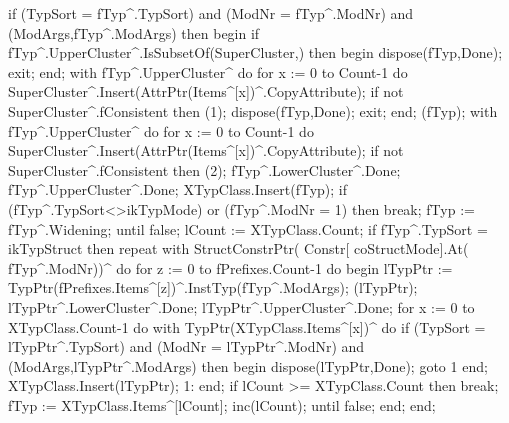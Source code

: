                if (TypSort = fTyp^.TypSort) and (ModNr = fTyp^.ModNr) and
                     (ModArgs,fTyp^.ModArgs) then
               begin
                  if fTyp^.UpperCluster^.IsSubsetOf(SuperCluster,) then
                  begin
                     dispose(fTyp,Done);
                     exit;
                  end;
                  with fTyp^.UpperCluster^ do
                     for x := 0 to Count-1 do
                        SuperCluster^.Insert(AttrPtr(Items^[x])^.CopyAttribute);
                  if not SuperCluster^.fConsistent
                  then (1);
                  dispose(fTyp,Done);
                  exit;
               end;
         (fTyp);
         with fTyp^.UpperCluster^ do
            for x := 0 to Count-1 do
               SuperCluster^.Insert(AttrPtr(Items^[x])^.CopyAttribute);
         if not SuperCluster^.fConsistent then (2);
         fTyp^.LowerCluster^.Done;
         fTyp^.UpperCluster^.Done;
         XTypClass.Insert(fTyp);
         if (fTyp^.TypSort<>ikTypMode) or (fTyp^.ModNr = 1) then break;
         fTyp := fTyp^.Widening;
      until false;
      lCount := XTypClass.Count;
      if fTyp^.TypSort = ikTypStruct then
         repeat
            with StructConstrPtr( Constr[ coStructMode].At( fTyp^.ModNr))^ do
               for z := 0 to fPrefixes.Count-1 do
               begin
                  lTypPtr := TypPtr(fPrefixes.Items^[z])^.InstTyp(fTyp^.ModArgs);
                  (lTypPtr);
                  lTypPtr^.LowerCluster^.Done;
                  lTypPtr^.UpperCluster^.Done;
                  for x := 0 to XTypClass.Count-1 do
                     with TypPtr(XTypClass.Items^[x])^ do
                        if (TypSort = lTypPtr^.TypSort) and (ModNr = lTypPtr^.ModNr) and
                              (ModArgs,lTypPtr^.ModArgs) then
                        begin
                           dispose(lTypPtr,Done);
                           goto 1
                        end;
                  XTypClass.Insert(lTypPtr);
                  1:
               end;
            if lCount >= XTypClass.Count then break;
            fTyp := XTypClass.Items^[lCount];
            inc(lCount);
         until false;
   end;
end;
\eatline

